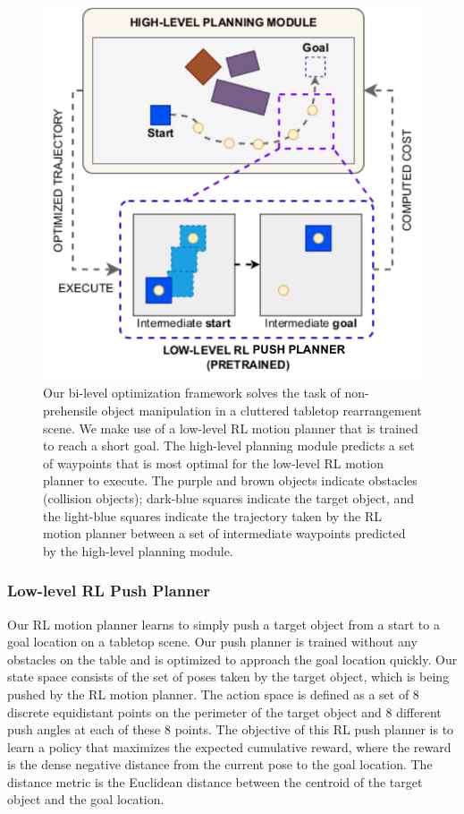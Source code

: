 \begin{figure}
    \centering \includegraphics[scale=0.8]{figures/bl-manipulator/pipeline.v9.pdf} 
    \caption[Bi-level optimization pipeline]{Our bi-level optimization framework solves the task of non-prehensile object manipulation in a cluttered tabletop rearrangement scene. We make use of a low-level RL motion planner that is trained to reach a short goal. The high-level planning module predicts a set of waypoints that is most optimal for the low-level RL motion planner to execute. The purple and brown objects indicate obstacles (collision objects); dark-blue squares indicate the target object, and the light-blue squares indicate the trajectory taken by the RL motion planner between a set of intermediate waypoints predicted by the high-level planning module.}
    \label{fig:pipeline}
\end{figure}

\subsubsection{Low-level RL Push Planner}
\label{sec:low-level-rl}

Our RL motion planner learns to simply push a target object from a start to a goal location on a tabletop scene. Our push planner is trained without any obstacles on the table and is optimized to approach the goal location quickly. Our state space consists of the set of poses taken by the target object, which is being pushed by the RL motion planner. The action space is defined as a set of 8 discrete equidistant points on the perimeter of the target object and 8 different push angles at each of these 8 points. The objective of this RL push planner is to learn a policy that maximizes the expected cumulative reward, where the reward is the dense negative distance from the current pose to the goal location. The distance metric is the Euclidean distance between the centroid of the target object and the goal location.

